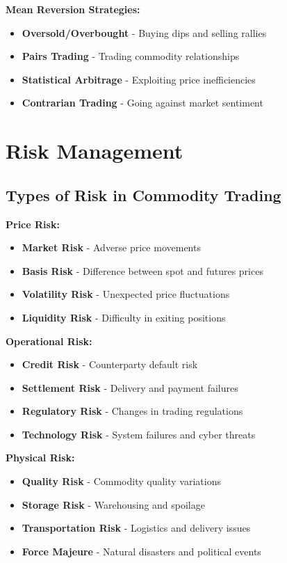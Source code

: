\documentclass[12pt]{article}
\begin{document}
\textbf{Mean Reversion Strategies:}
\begin{itemize}
    \item \textbf{Oversold/Overbought} - Buying dips and selling rallies
    \item \textbf{Pairs Trading} - Trading commodity relationships
    \item \textbf{Statistical Arbitrage} - Exploiting price inefficiencies
    \item \textbf{Contrarian Trading} - Going against market sentiment
\end{itemize}

\section{Risk Management}

\subsection{Types of Risk in Commodity Trading}

\textbf{Price Risk:}
\begin{itemize}
    \item \textbf{Market Risk} - Adverse price movements
    \item \textbf{Basis Risk} - Difference between spot and futures prices
    \item \textbf{Volatility Risk} - Unexpected price fluctuations
    \item \textbf{Liquidity Risk} - Difficulty in exiting positions
\end{itemize}

\textbf{Operational Risk:}
\begin{itemize}
    \item \textbf{Credit Risk} - Counterparty default risk
    \item \textbf{Settlement Risk} - Delivery and payment failures
    \item \textbf{Regulatory Risk} - Changes in trading regulations
    \item \textbf{Technology Risk} - System failures and cyber threats
\end{itemize}

\textbf{Physical Risk:}
\begin{itemize}
    \item \textbf{Quality Risk} - Commodity quality variations
    \item \textbf{Storage Risk} - Warehousing and spoilage
    \item \textbf{Transportation Risk} - Logistics and delivery issues
    \item \textbf{Force Majeure} - Natural disasters and political events
\end{itemize}
\end{document}
